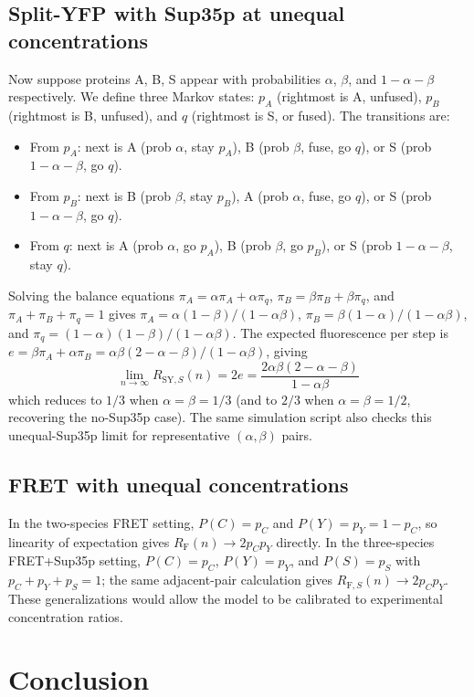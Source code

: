 \documentclass[referee,lineno,pdflatex,sn-mathphys-ay]{sn-jnl}
\begin{document}
\subsection{Split-YFP with Sup35p at unequal concentrations}\label{subsec:unequal-sup35}
Now suppose proteins A, B, S appear with probabilities $\alpha$, $\beta$, and $1 - \alpha - \beta$ respectively. We define three Markov states: $p_A$ (rightmost is A, unfused), $p_B$ (rightmost is B, unfused), and $q$ (rightmost is S, or fused). The transitions are:
\begin{itemize}
\item From $p_A$: next is A (prob $\alpha$, stay $p_A$), B (prob $\beta$, fuse, go $q$), or S (prob $1{-}\alpha{-}\beta$, go $q$).
\item From $p_B$: next is B (prob $\beta$, stay $p_B$), A (prob $\alpha$, fuse, go $q$), or S (prob $1{-}\alpha{-}\beta$, go $q$).
\item From $q$: next is A (prob $\alpha$, go $p_A$), B (prob $\beta$, go $p_B$), or S (prob $1{-}\alpha{-}\beta$, stay $q$).
\end{itemize}
Solving the balance equations $\pi_A = \alpha\pi_A + \alpha\pi_q$, $\pi_B = \beta\pi_B + \beta\pi_q$, and $\pi_A + \pi_B + \pi_q = 1$ gives $\pi_A = \alpha(1-\beta)/(1 - \alpha\beta)$, $\pi_B = \beta(1-\alpha)/(1 - \alpha\beta)$, and $\pi_q = (1-\alpha)(1-\beta)/(1-\alpha\beta)$. The expected fluorescence per step is $e = \beta\pi_A + \alpha\pi_B = \alpha\beta(2 - \alpha - \beta)/(1 - \alpha\beta)$, giving
\[
\lim_{n \to \infty} R_{\text{SY},S}(n) = 2e = \frac{2\alpha\beta(2 - \alpha - \beta)}{1 - \alpha\beta}
\]
which reduces to $1/3$ when $\alpha = \beta = 1/3$ (and to $2/3$ when $\alpha = \beta = 1/2$, recovering the no-Sup35p case).
The same simulation script also checks this unequal-Sup35p limit for representative $(\alpha,\beta)$ pairs.

\subsection{FRET with unequal concentrations}
In the two-species FRET setting, $P(C)=p_C$ and $P(Y)=p_Y=1-p_C$, so linearity of expectation gives $R_{\text{F}}(n) \to 2p_Cp_Y$ directly. In the three-species FRET+Sup35p setting, $P(C)=p_C$, $P(Y)=p_Y$, and $P(S)=p_S$ with $p_C+p_Y+p_S=1$; the same adjacent-pair calculation gives $R_{\text{F},S}(n)\to 2p_Cp_Y$. These generalizations would allow the model to be calibrated to experimental concentration ratios.

\section{Conclusion}
\end{document}
